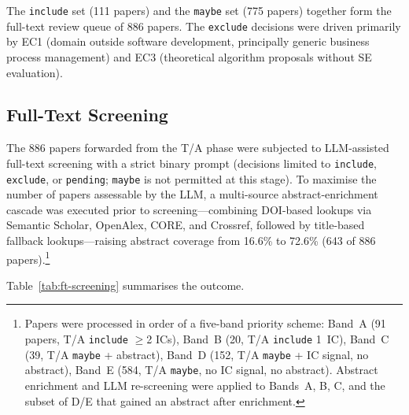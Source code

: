 The \texttt{include} set (111 papers) and the \texttt{maybe} set (775 papers)
together form the full-text review queue of 886 papers. The
\texttt{exclude} decisions were driven primarily by EC1 (domain outside
software development, principally generic business process management) and EC3
(theoretical algorithm proposals without SE evaluation).

\subsection{Full-Text Screening}

The 886 papers forwarded from the T/A phase were subjected to LLM-assisted
full-text screening with a strict binary prompt (decisions limited to
\texttt{include}, \texttt{exclude}, or \texttt{pending}; \texttt{maybe}
is not permitted at this stage). To maximise the number of papers assessable by the LLM, a
multi-source abstract-enrichment cascade was executed prior to
screening---combining DOI-based lookups via Semantic Scholar, OpenAlex, CORE,
and Crossref, followed by title-based fallback lookups---raising abstract
coverage from 16.6\% to 72.6\% (643 of 886 papers).\footnote{Papers were
  processed in order of a five-band priority scheme: Band~A (91 papers,
  T/A \texttt{include} $\geq$2 ICs), Band~B (20, T/A \texttt{include} 1~IC),
  Band~C (39, T/A \texttt{maybe} + abstract), Band~D (152, T/A \texttt{maybe}
  + IC signal, no abstract), Band~E (584, T/A \texttt{maybe}, no IC signal, no
  abstract). Abstract enrichment and LLM re-screening were applied to Bands~A,
  B, C, and the subset of D/E that gained an abstract after enrichment.}

Table~\ref{tab:ft-screening} summarises the outcome.

